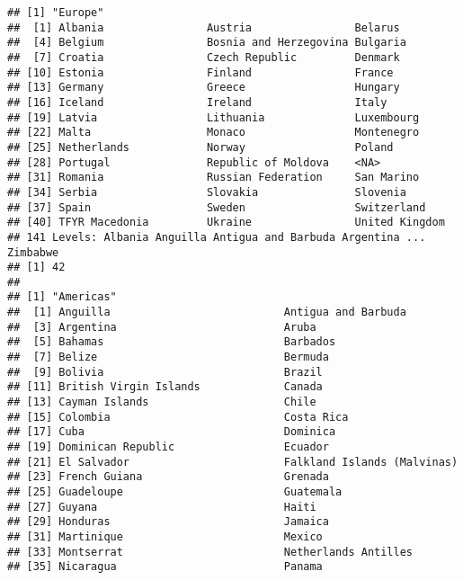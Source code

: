 \documentclass[]{article}
\begin{document}
\begin{verbatim}
## [1] "Europe"
##  [1] Albania                Austria                Belarus               
##  [4] Belgium                Bosnia and Herzegovina Bulgaria              
##  [7] Croatia                Czech Republic         Denmark               
## [10] Estonia                Finland                France                
## [13] Germany                Greece                 Hungary               
## [16] Iceland                Ireland                Italy                 
## [19] Latvia                 Lithuania              Luxembourg            
## [22] Malta                  Monaco                 Montenegro            
## [25] Netherlands            Norway                 Poland                
## [28] Portugal               Republic of Moldova    <NA>                  
## [31] Romania                Russian Federation     San Marino            
## [34] Serbia                 Slovakia               Slovenia              
## [37] Spain                  Sweden                 Switzerland           
## [40] TFYR Macedonia         Ukraine                United Kingdom        
## 141 Levels: Albania Anguilla Antigua and Barbuda Argentina ... Zimbabwe
## [1] 42
## 
## [1] "Americas"
##  [1] Anguilla                           Antigua and Barbuda               
##  [3] Argentina                          Aruba                             
##  [5] Bahamas                            Barbados                          
##  [7] Belize                             Bermuda                           
##  [9] Bolivia                            Brazil                            
## [11] British Virgin Islands             Canada                            
## [13] Cayman Islands                     Chile                             
## [15] Colombia                           Costa Rica                        
## [17] Cuba                               Dominica                          
## [19] Dominican Republic                 Ecuador                           
## [21] El Salvador                        Falkland Islands (Malvinas)       
## [23] French Guiana                      Grenada                           
## [25] Guadeloupe                         Guatemala                         
## [27] Guyana                             Haiti                             
## [29] Honduras                           Jamaica                           
## [31] Martinique                         Mexico                            
## [33] Montserrat                         Netherlands Antilles              
## [35] Nicaragua                          Panama                            

\end{verbatim}
\end{document}
